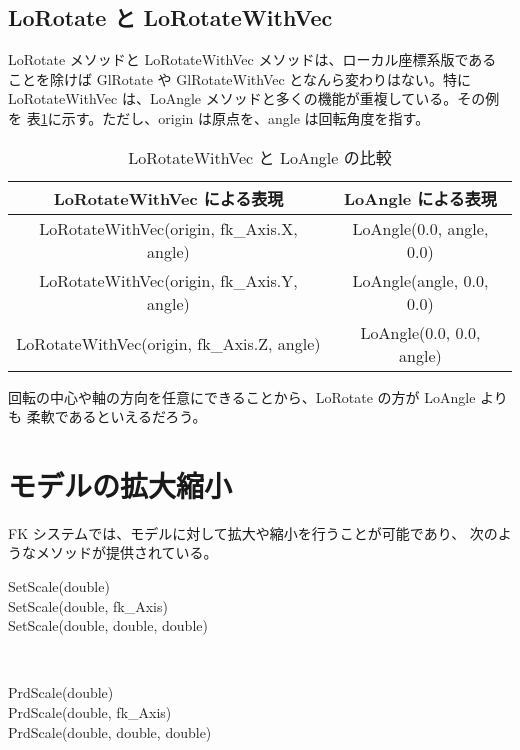 \subsection{LoRotate と LoRotateWithVec}
LoRotate メソッドと LoRotateWithVec メソッドは、ローカル座標系版である
ことを除けば GlRotate や GlRotateWithVec となんら変わりはない。特に
LoRotateWithVec は、LoAngle メソッドと多くの機能が重複している。その例を
表\ref{tbl:fkAngle1}に示す。ただし、origin は原点を、angle は回転角度を指す。

\begin{table}[H]
\caption{LoRotateWithVec と LoAngle の比較}
\label{tbl:fkAngle1}
\begin{center}
\begin{tabular}{|c|c|}
\hline
LoRotateWithVec による表現 & LoAngle による表現 \\ \hline \hline
LoRotateWithVec(origin, fk\_Axis.X, angle) & LoAngle(0.0, angle, 0.0) \\ \hline
LoRotateWithVec(origin, fk\_Axis.Y, angle) & LoAngle(angle, 0.0, 0.0) \\ \hline
LoRotateWithVec(origin, fk\_Axis.Z, angle) & LoAngle(0.0, 0.0, angle) \\ \hline
\end{tabular}
\end{center}
\end{table}

回転の中心や軸の方向を任意にできることから、LoRotate の方が LoAngle よりも
柔軟であるといえるだろう。

\section{モデルの拡大縮小}
FK システムでは、モデルに対して拡大や縮小を行うことが可能であり、
次のようなメソッドが提供されている。
\begin{description}
\item[SetScale(double)]
\item[SetScale(double, fk\_Axis)]
\item[SetScale(double, double, double)] ~ \\

\item[PrdScale(double)]
\item[PrdScale(double, fk\_Axis)]
\item[PrdScale(double, double, double)]
\end{description}

